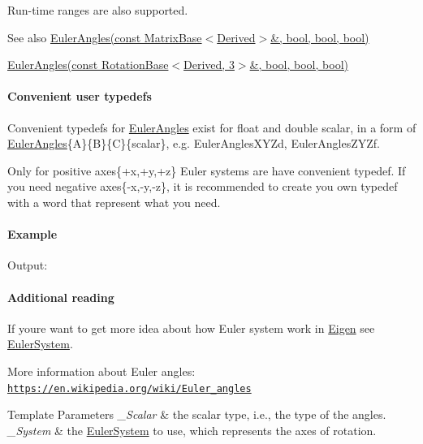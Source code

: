 Run-\/time ranges are also supported. \begin{DoxySeeAlso}{See also}
\hyperlink{class_eigen_1_1_euler_angles_ab545bb022c56b1b93463c308f1bcc489}{Euler\+Angles(const Matrix\+Base$<$\+Derived$>$\&, bool, bool, bool)} 

\hyperlink{class_eigen_1_1_euler_angles_aeaf9524ff49ee720786e78f44c23cc17}{Euler\+Angles(const Rotation\+Base$<$\+Derived, 3$>$\&, bool, bool, bool)}
\end{DoxySeeAlso}
\paragraph*{Convenient user typedefs}

Convenient typedefs for \hyperlink{class_eigen_1_1_euler_angles}{Euler\+Angles} exist for float and double scalar, in a form of \hyperlink{class_eigen_1_1_euler_angles}{Euler\+Angles}\{A\}\{B\}\{C\}\{scalar\}, e.\+g. Euler\+Angles\+X\+Y\+Zd, Euler\+Angles\+Z\+Y\+Zf.

Only for positive axes\{+x,+y,+z\} Euler systems are have convenient typedef. If you need negative axes\{-\/x,-\/y,-\/z\}, it is recommended to create you own typedef with a word that represent what you need.

\paragraph*{Example}


\begin{DoxyCodeInclude}
\end{DoxyCodeInclude}
 Output\+: 
\begin{DoxyVerbInclude}
\end{DoxyVerbInclude}


\paragraph*{Additional reading}

If you\textquotesingle{}re want to get more idea about how Euler system work in \hyperlink{namespace_eigen}{Eigen} see \hyperlink{class_eigen_1_1_euler_system}{Euler\+System}.

More information about Euler angles\+: \href{https://en.wikipedia.org/wiki/Euler_angles}{\tt https\+://en.\+wikipedia.\+org/wiki/\+Euler\+\_\+angles}


\begin{DoxyTemplParams}{Template Parameters}
{\em \+\_\+\+Scalar} & the scalar type, i.\+e., the type of the angles.\\
\hline
{\em \+\_\+\+System} & the \hyperlink{class_eigen_1_1_euler_system}{Euler\+System} to use, which represents the axes of rotation. \\
\hline
\end{DoxyTemplParams}


